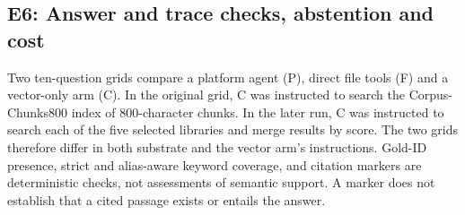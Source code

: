 
\subsection{E6: Answer and trace checks, abstention and cost}
\label{sec:e5}
\label{sec:agentic}\label{sec:abstention}\label{sec:composition}\label{sec:eval-agent}
Two ten-question grids compare a platform agent (P), direct file tools (F)
and a vector-only arm (C). In the original grid, C was instructed to search
the Corpus-Chunks800 index of 800-character chunks. In the later run, C was
instructed to search each of the five selected libraries and merge results by
score. The two grids therefore differ in both substrate and the vector arm's
instructions. Gold-ID presence, strict and
alias-aware keyword coverage, and citation markers are deterministic checks,
not assessments of semantic support. A marker does not establish that a cited
passage exists or entails the answer.

